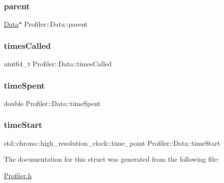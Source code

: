 \subsubsection{\texorpdfstring{parent}{parent}}
{\footnotesize\ttfamily \hyperlink{struct_profiler_1_1_data}{Data}$\ast$ Profiler\+::\+Data\+::parent}

\mbox{\label{struct_profiler_1_1_data_a0b2089e9dd5738281e01baa681b4e542}} 
\subsubsection{\texorpdfstring{times\+Called}{timesCalled}}
{\footnotesize\ttfamily uint64\+\_\+t Profiler\+::\+Data\+::times\+Called}

\mbox{\label{struct_profiler_1_1_data_a19d4cb0603046e7463c6dee9db916194}} 
\subsubsection{\texorpdfstring{time\+Spent}{timeSpent}}
{\footnotesize\ttfamily double Profiler\+::\+Data\+::time\+Spent}

\mbox{\label{struct_profiler_1_1_data_afbbb2195e44ec620890e389db3963afc}} 
\subsubsection{\texorpdfstring{time\+Start}{timeStart}}
{\footnotesize\ttfamily std\+::chrono\+::high\+\_\+resolution\+\_\+clock\+::time\+\_\+point Profiler\+::\+Data\+::time\+Start}



The documentation for this struct was generated from the following file\+:\begin{DoxyCompactItemize}
\item 
\hyperlink{_profiler_8h}{Profiler.\+h}\end{DoxyCompactItemize}
